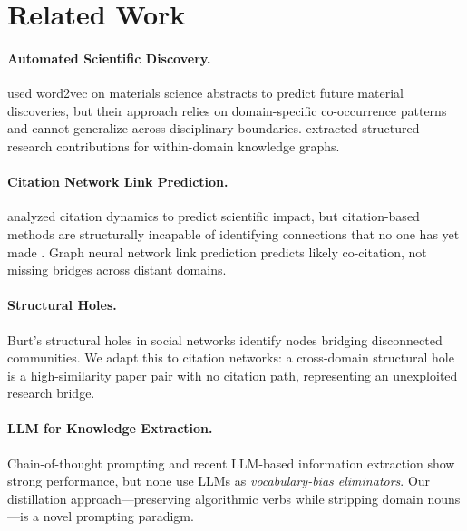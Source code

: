 \documentclass[11pt]{article}
\begin{document}
\section{Related Work}

\paragraph{Automated Scientific Discovery.}
\citet{tshitoyan2019unsupervised} used word2vec on materials science abstracts
to predict future material discoveries, but their approach relies on
domain-specific co-occurrence patterns and cannot generalize across
disciplinary boundaries. \citet{hope2021extracting} extracted structured
research contributions for within-domain knowledge graphs.

\paragraph{Citation Network Link Prediction.}
\citet{wang2021science} analyzed citation dynamics to predict scientific
impact, but citation-based methods are structurally incapable of identifying
connections that no one has yet made \citep{zhang2018link}. Graph neural
network link prediction \citep{zhang2018link} predicts likely co-citation,
not missing bridges across distant domains.

\paragraph{Structural Holes.}
Burt's structural holes \citep{burt2004structural} in social networks
identify nodes bridging disconnected communities. We adapt this to citation
networks: a cross-domain structural hole is a high-similarity paper pair
with no citation path, representing an unexploited research bridge.

\paragraph{LLM for Knowledge Extraction.}
Chain-of-thought prompting \citep{wei2022chain} and recent LLM-based
information extraction show strong performance, but none use LLMs as
\emph{vocabulary-bias eliminators}. Our distillation approach---preserving
algorithmic verbs while stripping domain nouns---is a novel prompting paradigm.
\end{document}
